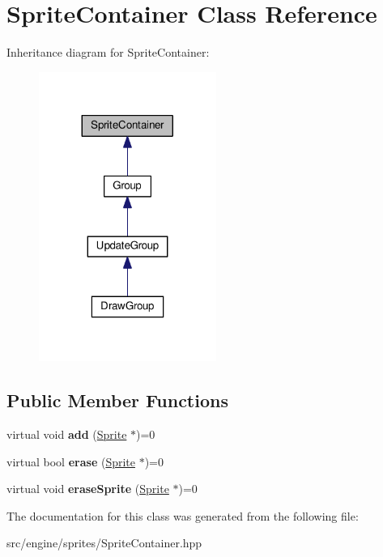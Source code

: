 \hypertarget{class_sprite_container}{}\section{Sprite\+Container Class Reference}
\label{class_sprite_container}


Inheritance diagram for Sprite\+Container\+:\nopagebreak
\begin{figure}[H]
\begin{center}
\leavevmode
\includegraphics[width=164pt]{class_sprite_container__inherit__graph}
\end{center}
\end{figure}
\subsection*{Public Member Functions}
\begin{DoxyCompactItemize}
\item 
virtual void {\bfseries add} (\hyperlink{class_sprite}{Sprite} $\ast$)=0\hypertarget{class_sprite_container_ae8bef1a585a539761956913a92704993}{}\label{class_sprite_container_ae8bef1a585a539761956913a92704993}

\item 
virtual bool {\bfseries erase} (\hyperlink{class_sprite}{Sprite} $\ast$)=0\hypertarget{class_sprite_container_afe42ab0e6f75490274f0d0cf6264d421}{}\label{class_sprite_container_afe42ab0e6f75490274f0d0cf6264d421}

\item 
virtual void {\bfseries erase\+Sprite} (\hyperlink{class_sprite}{Sprite} $\ast$)=0\hypertarget{class_sprite_container_a515f62b0a61c01cba6b27b24555a171e}{}\label{class_sprite_container_a515f62b0a61c01cba6b27b24555a171e}

\end{DoxyCompactItemize}


The documentation for this class was generated from the following file\+:\begin{DoxyCompactItemize}
\item 
src/engine/sprites/Sprite\+Container.\+hpp\end{DoxyCompactItemize}
